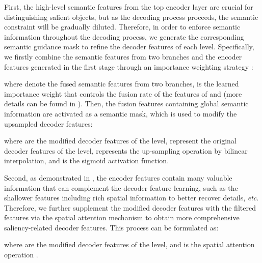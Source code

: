 \documentclass[journal]{IEEEtran}
\newcommand{\etc}{\textit{etc}}
\begin{document}
First, the high-level semantic features from the top encoder layer are crucial for distinguishing salient objects, but as the decoding process proceeds, the semantic constraint will be gradually diluted. Therefore, in order to enforce semantic information throughout the decoding process, we generate the corresponding semantic guidance mask to refine the decoder features of each level.
Specifically, we firstly combine the semantic features from two branches and the encoder features generated in the first stage through an importance weighting strategy \cite{CoADNet}:

where  denote the fused semantic features from two branches,  is the learned importance weight that controls the fusion rate of the features of  and  (more details can be found in \cite{CoADNet}). Then, the fusion features  containing global semantic information are activated as a semantic mask, which is used to modify the upsampled decoder features:

where  are the modified decoder features of the  level,  represent the original decoder features of the  level,  represents the up-sampling operation by bilinear interpolation, and  is the sigmoid activation function.

Second, as demonstrated in \cite{hou2017deeply}, the encoder features contain many valuable information that can complement the decoder feature learning, such as the shallower features including rich spatial information to better recover details, \etc.
Therefore, we further supplement the modified decoder features with the filtered features via the spatial attention mechanism \cite{sa} to obtain more comprehensive saliency-related decoder features.
This process can be formulated as:

where  are the modified decoder features of the  level, and  is the spatial attention operation \cite{sa}.
\end{document}
